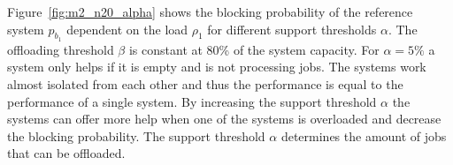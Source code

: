 

Figure~\ref{fig:m2_n20_alpha} shows the blocking probability of the reference system $p_{b_1}$ dependent on the load $\rho_1$ for different support thresholds $\alpha$. The offloading threshold $\beta$ is constant at 80\% of the system capacity. For $\alpha=5\%$ a system only helps if it is empty and is not processing jobs. The systems work almost isolated from each other and thus the performance is equal to the performance of a single system. By increasing the support threshold $\alpha$ the systems can offer more help when one of the systems is overloaded and decrease the blocking probability. The support threshold $\alpha$ determines the amount of jobs that can be offloaded.


